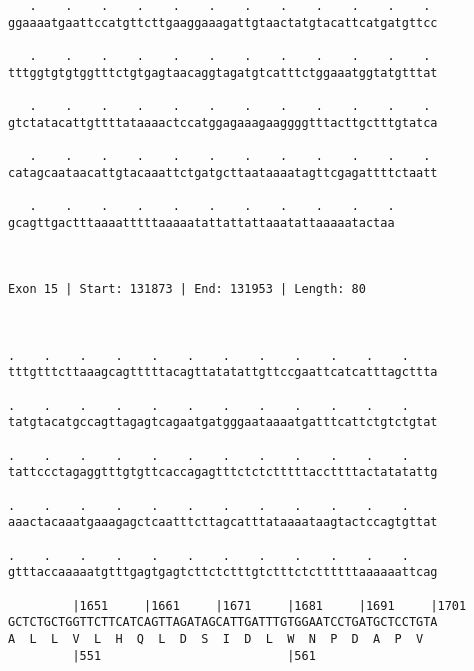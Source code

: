 \documentclass{article}
\begin{document}
\begin{Verbatim}
   .    .    .    .    .    .    .    .    .    .    .    . 
ggaaaatgaattccatgttcttgaaggaaagattgtaactatgtacattcatgatgttcc
                                                            
   .    .    .    .    .    .    .    .    .    .    .    . 
tttggtgtgtggtttctgtgagtaacaggtagatgtcatttctggaaatggtatgtttat
                                                            
   .    .    .    .    .    .    .    .    .    .    .    . 
gtctatacattgttttataaaactccatggagaaagaaggggtttacttgctttgtatca
                                                            
   .    .    .    .    .    .    .    .    .    .    .    . 
catagcaataacattgtacaaattctgatgcttaataaaatagttcgagattttctaatt
                                                            
   .    .    .    .    .    .    .    .    .    .    .
gcagttgactttaaaatttttaaaaatattattattaaatattaaaaatactaa
                                                      
                                                      
 
Exon 15 | Start: 131873 | End: 131953 | Length: 80



.    .    .    .    .    .    .    .    .    .    .    .    
tttgtttcttaaagcagtttttacagttatatattgttccgaattcatcatttagcttta
                                                            
.    .    .    .    .    .    .    .    .    .    .    .    
tatgtacatgccagttagagtcagaatgatgggaataaaatgatttcattctgtctgtat
                                                            
.    .    .    .    .    .    .    .    .    .    .    .    
tattccctagaggtttgtgttcaccagagtttctctctttttaccttttactatatattg
                                                            
.    .    .    .    .    .    .    .    .    .    .    .    
aaactacaaatgaaagagctcaatttcttagcatttataaaataagtactccagtgttat
                                                            
.    .    .    .    .    .    .    .    .    .    .    .    
gtttaccaaaaatgtttgagtgagtcttctctttgtctttctcttttttaaaaaattcag
                                                            
         |1651     |1661     |1671     |1681     |1691     |1701
GCTCTGCTGGTTCTTCATCAGTTAGATAGCATTGATTTGTGGAATCCTGATGCTCCTGTA
A  L  L  V  L  H  Q  L  D  S  I  D  L  W  N  P  D  A  P  V  
         |551                          |561                 
  

\end{Verbatim}
\end{document}
